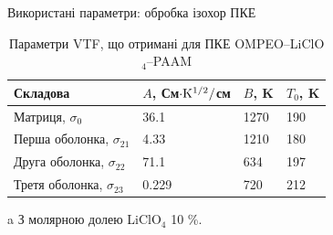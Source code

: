 \documentclass[10pt]{beamer}
\begin{document}
\begin{frame}{Використані параметри: обробка ізохор ПКЕ}
\footnotesize

\begin{table}[tb]
	\centering
	\begin{threeparttable} 
	\caption{\label{tab:temp} Параметри VTF, що отримані для ПКЕ OMPEO--LiClO$_4$--PAAM }
		\begin{tabular}{|l|l|l|l|}
			\hline
			{Складова}   & $A$, См$\cdot \rm{K}^{1/2}/$см & $B$, K & $T_0$, K  \\
			\hline
			Матриця, $\sigma_0$           &  36.1\tnote{a}  &  1270  &  190   \\
			Перша оболонка, $\sigma_{21}$   &  4.33  &  1210   &  180    \\
			Друга оболонка, $\sigma_{22}$  &  71.1   &  634     &  197   \\
			Третя оболонка, $\sigma_{23}$   & 0.229   &  720   &  212 \\
			\hline
		\end{tabular}
		\begin{tablenotes}
			\item[a] З молярною долею LiClO$_4$ 10 \%.
		\end{tablenotes}
	\end{threeparttable}
\end{table}

\end{frame}
\end{document}
